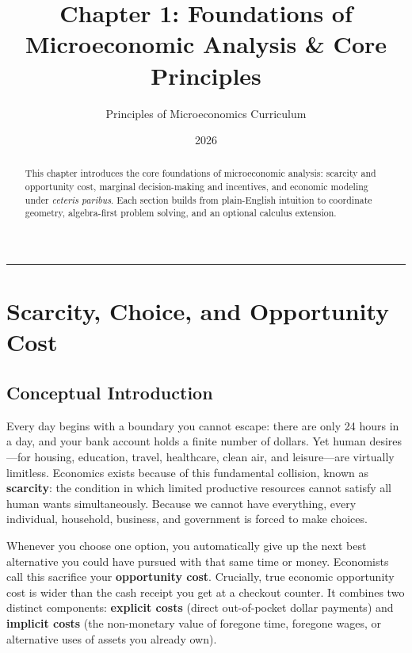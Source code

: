\documentclass[11pt,letterpaper]{article}
\begin{document}
\title{\Huge\bfseries\color{SlateBlue} Chapter 1: Foundations of Microeconomic Analysis \& Core Principles}
\author{\large Principles of Microeconomics Curriculum}
\date{2026}
\maketitle

\thispagestyle{plain}

\begin{abstract}
This chapter introduces the core foundations of microeconomic analysis: scarcity and opportunity cost, marginal decision-making and incentives, and economic modeling under \emph{ceteris paribus}. Each section builds from plain-English intuition to coordinate geometry, algebra-first problem solving, and an optional calculus extension.
\end{abstract}

\tableofcontents
\vspace{1.5em}
\hrule
\vspace{1.5em}

\section{Scarcity, Choice, and Opportunity Cost}

\subsection*{Conceptual Introduction}
Every day begins with a boundary you cannot escape: there are only 24 hours in a day, and your bank account holds a finite number of dollars. Yet human desires—for housing, education, travel, healthcare, clean air, and leisure—are virtually limitless. Economics exists because of this fundamental collision, known as \textbf{scarcity}: the condition in which limited productive resources cannot satisfy all human wants simultaneously. Because we cannot have everything, every individual, household, business, and government is forced to make choices.

Whenever you choose one option, you automatically give up the next best alternative you could have pursued with that same time or money. Economists call this sacrifice your \textbf{opportunity cost}. Crucially, true economic opportunity cost is wider than the cash receipt you get at a checkout counter. It combines two distinct components: \textbf{explicit costs} (direct out-of-pocket dollar payments) and \textbf{implicit costs} (the non-monetary value of foregone time, foregone wages, or alternative uses of assets you already own).
\end{document}
